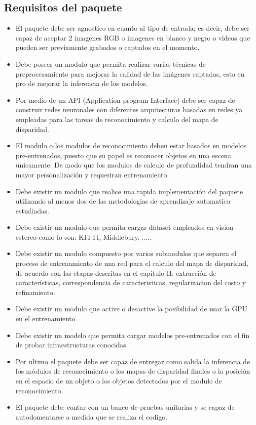 \subsection{Requisitos del paquete}
\begin{itemize}
    \item El paquete debe ser agnostico en cuanto al tipo de entrada; es decir, debe ser capaz de aceptar 2 imagenes RGB o imagenes en blanco y negro o videos que pueden ser previamente grabados o  captados en el momento.
    \item Debe poseer un modulo que permita realizar varias técnicas de preprocesamiento para mejorar la calidad de las imágenes captadas, esto en pro de mejorar la inferencia de los modelos.
    \item Por medio de un API (Application program Interface) debe ser capaz de construir redes neuronales con diferentes arquitecturas basadas en redes ya empleadas para las tareas de reconocimiento y calculo del mapa de disparidad.
    \item El modulo o los modulos de reconocimiento deben estar basados en modelos pre-entrenados, puesto que su papel es reconocer objetos en una escena unicamente. De modo que los modulos de calculo de profundidad tendran una mayor personalización y requeriran entrenamiento.
    \item Debe existir un modulo que realice una rapida implementación del paquete utilizando al menos dos de las metodologias de aprendizaje automatico estudiadas.
    \item Debe existir un modulo que permita cargar dataset empleados en vision estereo como lo son: KITTI, Middlebury, .....
    \item Debe existir un modulo compuesto por varios submodulos que separen el proceso de entrenamiento de una red para el calculo del mapa de disparidad, de acuerdo con las etapas descritas en el capitulo II: extracción de características, correspondencia de caracteristicas, regularizacion del costo y refinamiento.
    \item Debe existir un modulo que active o desactive la posibilidad de usar la GPU en el entrenamiento
    \item Debe existir un modelo que permita cargar modelos pre-entrenados con el fin de probar infraestructuras conocidas.
    \item Por ultimo el paquete debe ser capaz de entregar como salida la inferencia de los módulos de reconocimiento o los mapas de disparidad finales o la posición en el espacio de un objeto o los objetos detectados por el modulo de reconocimiento.
    \item El paquete debe contar con un banco de pruebas unitarias y se capaz de autodomentarse a medida que se realiza el codigo.
\end{itemize}